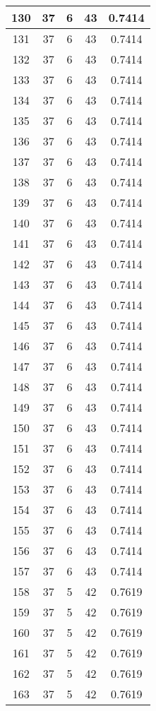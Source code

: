 \documentclass[letterpaper, 12pt]{article}
\begin{document}
\begin{longtable}{|c|c|c|c|c|}
\hline
130 & 37 & 6 & 43 & 0.7414 \\
\hline
131 & 37 & 6 & 43 & 0.7414 \\
\hline
132 & 37 & 6 & 43 & 0.7414 \\
\hline
133 & 37 & 6 & 43 & 0.7414 \\
\hline
134 & 37 & 6 & 43 & 0.7414 \\
\hline
135 & 37 & 6 & 43 & 0.7414 \\
\hline
136 & 37 & 6 & 43 & 0.7414 \\
\hline
137 & 37 & 6 & 43 & 0.7414 \\
\hline
138 & 37 & 6 & 43 & 0.7414 \\
\hline
139 & 37 & 6 & 43 & 0.7414 \\
\hline
140 & 37 & 6 & 43 & 0.7414 \\
\hline
141 & 37 & 6 & 43 & 0.7414 \\
\hline
142 & 37 & 6 & 43 & 0.7414 \\
\hline
143 & 37 & 6 & 43 & 0.7414 \\
\hline
144 & 37 & 6 & 43 & 0.7414 \\
\hline
145 & 37 & 6 & 43 & 0.7414 \\
\hline
146 & 37 & 6 & 43 & 0.7414 \\
\hline
147 & 37 & 6 & 43 & 0.7414 \\
\hline
148 & 37 & 6 & 43 & 0.7414 \\
\hline
149 & 37 & 6 & 43 & 0.7414 \\
\hline
150 & 37 & 6 & 43 & 0.7414 \\
\hline
151 & 37 & 6 & 43 & 0.7414 \\
\hline
152 & 37 & 6 & 43 & 0.7414 \\
\hline
153 & 37 & 6 & 43 & 0.7414 \\
\hline
154 & 37 & 6 & 43 & 0.7414 \\
\hline
155 & 37 & 6 & 43 & 0.7414 \\
\hline
156 & 37 & 6 & 43 & 0.7414 \\
\hline
157 & 37 & 6 & 43 & 0.7414 \\
\hline
158 & 37 & 5 & 42 & 0.7619 \\
\hline
159 & 37 & 5 & 42 & 0.7619 \\
\hline
160 & 37 & 5 & 42 & 0.7619 \\
\hline
161 & 37 & 5 & 42 & 0.7619 \\
\hline
162 & 37 & 5 & 42 & 0.7619 \\
\hline
163 & 37 & 5 & 42 & 0.7619 \\

\end{longtable}
\end{document}
